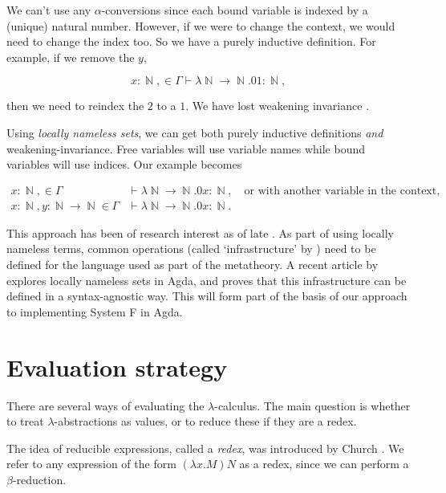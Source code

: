\documentclass[logo,bsc,singlespacing,parskip,online]{infthesis}
\DeclareMathOperator{\nat}{\mathbb{N}}
\begin{document}
We can't use any $\alpha$-conversions since each bound variable is indexed by a
(unique) natural number. However, if we were to change the context, we would
need to change the index too. So we have a purely inductive definition. For
example, if we remove the $y$,

\begin{equation*}
  x \colon \nat, \in \Gamma \vdash \lambda \nat \to \nat. 0 1 \colon \nat,
\end{equation*}

then we need to reindex the $2$ to a $1$. We have lost weakening invariance
\citep{aydemir_engineering_2008}.

Using \textit{locally nameless sets}, we can get both purely inductive
definitions \textit{and} weakening-invariance. Free variables will use variable
names while bound variables will use indices. Our example becomes

\begin{align*}
  x \colon \nat, \in \Gamma &\vdash \lambda \nat \to \nat. 0 x \colon \nat,\quad \text{or with another variable in the context,}\\
  x \colon \nat, y \colon \nat \to \nat \in \Gamma &\vdash \lambda \nat \to \nat. 0 x \colon \nat.
\end{align*}

This approach has been of research interest as of late \citep{aydemir_engineering_2008}
\citep{chargueraud_locally_2012}. As part of using locally nameless terms, common operations (called
`infrastructure' by ) need to be defined for the language used as part of the metatheory. A recent
article by explores locally nameless sets in Agda, and proves that this infrastructure can be
defined in a syntax-agnostic way. This will form part of the basis of our approach to implementing
System F in Agda.

\section{Evaluation strategy}
\label{section:evaluation_strategy}
There are several ways of evaluating the $\lambda$-calculus. The main question is whether to treat
$\lambda$-abstractions as values, or to reduce these if they are a redex.

The idea of reducible expressions, called a \textit{redex}, was introduced by Church
\citet[p.~56]{pierce_types_2002}. We refer to any expression of the form $(\lambda x. M) N$ as a
redex, since we can perform a $\beta$-reduction.
\end{document}
